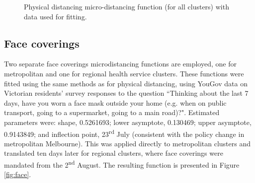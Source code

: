 \begin{figure}[ht]
    \caption{Physical distancing micro-distancing function (for all clusters) with data used for fitting.}
    \label{fig:physical}
\end{figure}

\subsection{Face coverings}
Two separate face coverings microdistancing functions are employed, one for metropolitan and one for regional health service clusters. These functions were fitted using the same methods as for physical distancing, using YouGov data on Victorian residents' survey responses to the question ``Thinking about the last 7 days, have you worn a face mask outside your home (e.g. when on public transport, going to a supermarket, going to a main road)?". Estimated parameters were: shape, 0.5261693; lower asymptote, 0.130469; upper asymptote, 0.9143849; and inflection point, 23\textsuperscript{rd} July (consistent with the policy change in metropolitan Melbourne). This was applied directly to metropolitan clusters and translated ten days later for regional clusters, where face coverings were mandated from the 2\textsuperscript{nd} August. The resulting function is presented in Figure \ref{fig:face}.

